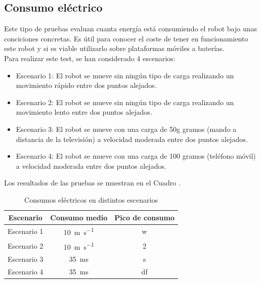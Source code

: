 \subsection{Consumo eléctrico} 
\label{sec:consumo}
\noindent Este tipo de pruebas evaluan cuanta energía está consumiendo el robot bajo unas conciciones concretas. Es útil para 
conocer el coste de tener en funcionamiento este robot y si es viable utilizarlo sobre plataformas móviles a baterías. 
\\
Para realizar este test, se han considerado 4 escenarios:
\begin{itemize}
\item Escenario 1: El robot se mueve sin ningún tipo de carga realizando un movimiento rápido entre dos puntos alejados.
\item Escenario 2: El robot se mueve sin ningún tipo de carga realizando un movimiento lento entre dos puntos alejados.
\item Escenario 3: El robot se mueve con una carga de 50g gramos (mando a distancia de la televisión) a velocidad moderada entre dos puntos alejados.
\item Escenario 4: El robot se mueve con una carga de 100 gramos (teléfono móvil) a velocidad moderada entre dos puntos alejados.

\end{itemize}
Los resultados de las pruebas se muestran en el Cuadro \label{cuadro:consumos}.
\begin{table}[H]
\begin{center}
\begin{tabular}{|c|c|c|}
\hline
\textbf{Escenario} & \textbf{Consumo medio} & \textbf{Pico de consumo}\\
\hline
Escenario 1 & \SI{10}{\meter\per\second} & w\\
Escenario 2 & \SI{10}{\meter\per\second} & 2\\
Escenario 3 & \SI{35}{\milli\second} & s \\
Escenario 4 & \SI{35}{\milli\second} & df\\
\hline
\end{tabular}
\caption{Consumos eléctricos en distintos escenarios}
\label{cuadro:consumos}
\end{center}
\end{table}